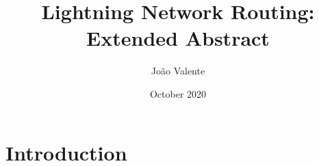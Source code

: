 \documentclass{article}
\title{Lightning Network Routing: Extended Abstract}
\author{João Valente}
\date{October 2020}
\begin{document}
\maketitle

\section{Introduction}
\end{document}
